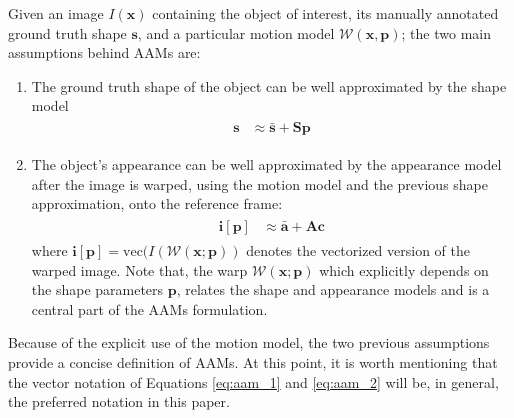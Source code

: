 Given an image $I(\mathbf{x})$ containing the object of interest, its manually annotated ground truth shape $\mathbf{s}$, and a particular motion model $\mathcal{W}(\mathbf{x}, \mathbf{p})$; the two main assumptions behind AAMs are:
\begin{enumerate}
	\item The ground truth shape of the object can be well approximated by the shape model
	\begin{eqnarray}
		\begin{aligned}
			\mathbf{s} & \approx \mathbf{\bar{s}} + \mathbf{S} \mathbf{p}
		\end{aligned}
	    \label{eq:aam_1}
	\end{eqnarray}

	\item The object's appearance can be well approximated by the appearance model after the image is warped, using the motion model and the previous shape approximation, onto the reference frame:
	\begin{eqnarray}
		\begin{aligned}
			\mathbf{i}[\mathbf{p}] & \approx \mathbf{\bar{a}} + \mathbf{A} \mathbf{c} 
		\end{aligned}
	    \label{eq:aam_2}
	\end{eqnarray}
	where $\mathbf{i}[\mathbf{p}] = \mathrm{vec}(I(\mathcal{W}(\mathbf{x}; \mathbf{p}))$ denotes the vectorized version of the warped image. Note that, the warp $\mathcal{W}(\mathbf{x}; \mathbf{p})$ which explicitly depends on the shape parameters $\mathbf{p}$, relates the shape and appearance models and is a central part of the AAMs formulation.
\end{enumerate}

Because of the explicit use of the motion model, the two previous assumptions provide a concise definition of AAMs. At this point, it is worth mentioning that the vector notation of Equations \ref{eq:aam_1} and \ref{eq:aam_2} will be, in general, the preferred notation in this paper.


